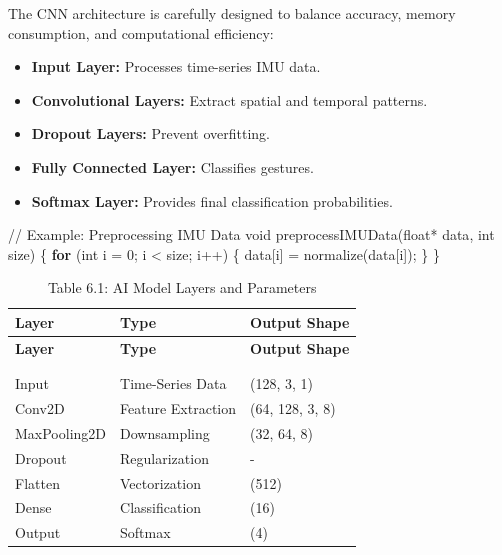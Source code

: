 \documentclass[
  9pt,
  letterpaper,
  abstract,
  titlepage]{scrbook}
\newenvironment{Shaded}{\begin{snugshade}}{\end{snugshade}}
\newcommand{\CommentTok}[1]{\textcolor[rgb]{0.37,0.37,0.37}{#1}}
\newcommand{\ControlFlowTok}[1]{\textcolor[rgb]{0.00,0.23,0.31}{\textbf{#1}}}
\newcommand{\DataTypeTok}[1]{\textcolor[rgb]{0.68,0.00,0.00}{#1}}
\newcommand{\DecValTok}[1]{\textcolor[rgb]{0.68,0.00,0.00}{#1}}
\newcommand{\NormalTok}[1]{\textcolor[rgb]{0.00,0.23,0.31}{#1}}
\newcommand{\OperatorTok}[1]{\textcolor[rgb]{0.37,0.37,0.37}{#1}}
\begin{document}
The CNN architecture is carefully designed to balance accuracy, memory
consumption, and computational efficiency:

\begin{itemize}
\item
  \textbf{Input Layer:} Processes time-series IMU data.
\item
  \textbf{Convolutional Layers:} Extract spatial and temporal patterns.
\item
  \textbf{Dropout Layers:} Prevent overfitting.
\item
  \textbf{Fully Connected Layer:} Classifies gestures.
\item
  \textbf{Softmax Layer:} Provides final classification probabilities.
\end{itemize}

\begin{Shaded}
\begin{Highlighting}[]
\CommentTok{// Example: Preprocessing IMU Data}
\DataTypeTok{void}\NormalTok{ preprocessIMUData}\OperatorTok{(}\DataTypeTok{float}\OperatorTok{*}\NormalTok{ data}\OperatorTok{,} \DataTypeTok{int}\NormalTok{ size}\OperatorTok{)} \OperatorTok{\{}
    \ControlFlowTok{for} \OperatorTok{(}\DataTypeTok{int}\NormalTok{ i }\OperatorTok{=} \DecValTok{0}\OperatorTok{;}\NormalTok{ i }\OperatorTok{\textless{}}\NormalTok{ size}\OperatorTok{;}\NormalTok{ i}\OperatorTok{++)} \OperatorTok{\{}
\NormalTok{        data}\OperatorTok{[}\NormalTok{i}\OperatorTok{]} \OperatorTok{=}\NormalTok{ normalize}\OperatorTok{(}\NormalTok{data}\OperatorTok{[}\NormalTok{i}\OperatorTok{]);}
    \OperatorTok{\}}
\OperatorTok{\}}
\end{Highlighting}
\end{Shaded}

\begin{longtable}[]{@{}lll@{}}
\toprule\noalign{}
\textbf{Layer} & \textbf{Type} & \textbf{Output Shape} \\
\midrule\noalign{}
\endfirsthead
\toprule\noalign{}
\textbf{Layer} & \textbf{Type} & \textbf{Output Shape} \\
\midrule\noalign{}
\endhead
\bottomrule\noalign{}
\tabularnewline
\caption{Table 6.1: AI Model Layers and Parameters}\tabularnewline
\endlastfoot
Input & Time-Series Data & (128, 3, 1) \\
Conv2D & Feature Extraction & (64, 128, 3, 8) \\
MaxPooling2D & Downsampling & (32, 64, 8) \\
Dropout & Regularization & - \\
Flatten & Vectorization & (512) \\
Dense & Classification & (16) \\
Output & Softmax & (4) \\
\end{longtable}
\end{document}
